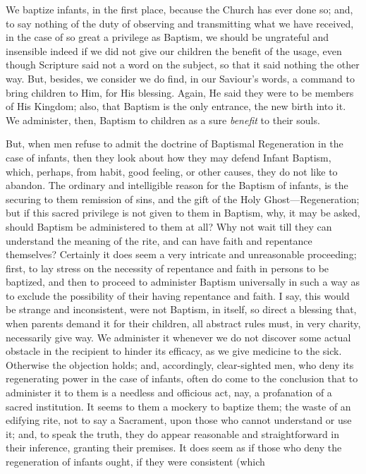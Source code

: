 We baptize infants, in the first place, because the Church has ever
done so; and, to say nothing of the duty of observing and transmitting
what we have received, in the case of so great a privilege as Baptism,
we should be ungrateful and insensible indeed if we did not give our
children the benefit of the usage, even though Scripture said not a
word on the subject, so that it said nothing the other way. But,
besides, we consider we do find, in our Saviour's words, a command
to bring children to Him, for His blessing. Again, He said they were
to be members of His Kingdom; also, that Baptism is the only entrance,
the new birth into it. We administer, then, Baptism to children as a
sure \emph{benefit} to their souls.

But, when men refuse to admit the doctrine of Baptismal
Regeneration in the case of infants, then they look about how they
may defend Infant Baptism, which, perhaps, from habit, good feeling,
or other causes, they do not like to abandon. The ordinary and
intelligible reason for the Baptism of infants, is the securing to
them remission of sins, and the gift of the Holy Ghost—Regeneration;
but if this sacred privilege is not given to them in Baptism, why, it
may be asked, should Baptism be administered to them at all? Why not
wait till they can understand the meaning of the rite, and can have
faith and repentance themselves? Certainly it does seem a very
intricate and unreasonable proceeding; first, to lay stress on the
necessity of repentance and faith in persons to be baptized, and then
to proceed to administer Baptism universally in such a way as to
exclude the possibility of their having repentance and faith. I say,
this would be strange and inconsistent, were not Baptism, in itself,
so direct a blessing that, when parents demand it for their children,
all abstract rules must, in very charity, necessarily give way. We
administer it whenever we do not discover some actual obstacle in the
recipient to hinder its efficacy, as we give medicine to the sick.
Otherwise the objection holds; and, accordingly, clear-sighted men,
who deny its regenerating power in the case of infants, often do come
to the conclusion that to administer it to them is a needless and
officious act, nay, a profanation of a sacred institution. It seems to
them a mockery to baptize them; the waste of an edifying rite, not to
say a Sacrament, upon those who cannot understand or use it; and, to
speak the truth, they do appear reasonable and straightforward in
their inference, granting their premises. It does seem as if those who
deny the regeneration of infants ought, if they were consistent (which
